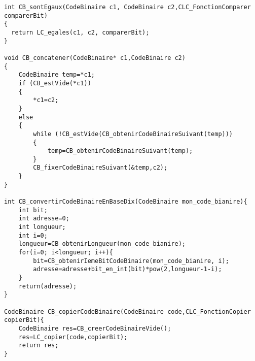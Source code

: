 \begin{verbatim}
int CB_sontEgaux(CodeBinaire c1, CodeBinaire c2,CLC_FonctionComparer comparerBit)
{
  return LC_egales(c1, c2, comparerBit);
}

void CB_concatener(CodeBinaire* c1,CodeBinaire c2)
{
	CodeBinaire temp=*c1;
	if (CB_estVide(*c1))
	{
		*c1=c2;
	}
	else
	{
		while (!CB_estVide(CB_obtenirCodeBinaireSuivant(temp)))
		{
			temp=CB_obtenirCodeBinaireSuivant(temp);
		}
		CB_fixerCodeBinaireSuivant(&temp,c2);
	}
}

int CB_convertirCodeBinaireEnBaseDix(CodeBinaire mon_code_bianire){
	int bit;
	int adresse=0;
	int longueur;
	int i=0;
	longueur=CB_obtenirLongueur(mon_code_bianire);
	for(i=0; i<longueur; i++){
		bit=CB_obtenirIemeBitCodeBinaire(mon_code_bianire, i);
		adresse=adresse+bit_en_int(bit)*pow(2,longueur-1-i);
	}
	return(adresse);
}

CodeBinaire CB_copierCodeBinaire(CodeBinaire code,CLC_FonctionCopier copierBit){
	CodeBinaire res=CB_creerCodeBinaireVide();
	res=LC_copier(code,copierBit);
	return res;
}



\end{verbatim}
 
